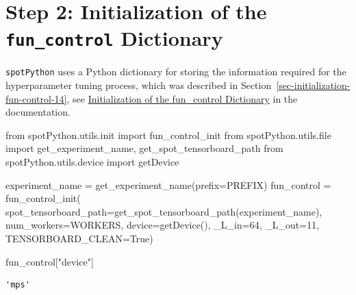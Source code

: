 \documentclass[
  letterpaper,
  DIV=11,
  numbers=noendperiod]{scrreprt}
\newenvironment{Shaded}{\begin{snugshade}}{\end{snugshade}}
\newcommand{\BuiltInTok}[1]{\textcolor[rgb]{0.00,0.23,0.31}{#1}}
\newcommand{\DecValTok}[1]{\textcolor[rgb]{0.68,0.00,0.00}{#1}}
\newcommand{\ImportTok}[1]{\textcolor[rgb]{0.00,0.46,0.62}{#1}}
\newcommand{\NormalTok}[1]{\textcolor[rgb]{0.00,0.23,0.31}{#1}}
\newcommand{\OperatorTok}[1]{\textcolor[rgb]{0.37,0.37,0.37}{#1}}
\newcommand{\StringTok}[1]{\textcolor[rgb]{0.13,0.47,0.30}{#1}}
\newcommand{\VariableTok}[1]{\textcolor[rgb]{0.07,0.07,0.07}{#1}}
\begin{document}
\hypertarget{step-2-initialization-of-the-fun_control-dictionary}{%
\section{\texorpdfstring{Step 2: Initialization of the
\texttt{fun\_control}
Dictionary}{Step 2: Initialization of the fun\_control Dictionary}}\label{step-2-initialization-of-the-fun_control-dictionary}}

\texttt{spotPython} uses a Python dictionary for storing the information
required for the hyperparameter tuning process, which was described in
Section~\ref{sec-initialization-fun-control-14}, see
\href{https://sequential-parameter-optimization.github.io/spotPython/14_spot_ray_hpt_torch_cifar10.html\#sec-initialization-fun-control-14}{Initialization
of the fun\_control Dictionary} in the documentation.

\begin{Shaded}
\begin{Highlighting}[]
\ImportTok{from}\NormalTok{ spotPython.utils.init }\ImportTok{import}\NormalTok{ fun\_control\_init}
\ImportTok{from}\NormalTok{ spotPython.utils.}\BuiltInTok{file} \ImportTok{import}\NormalTok{ get\_experiment\_name, get\_spot\_tensorboard\_path}
\ImportTok{from}\NormalTok{ spotPython.utils.device }\ImportTok{import}\NormalTok{ getDevice}

\NormalTok{experiment\_name }\OperatorTok{=}\NormalTok{ get\_experiment\_name(prefix}\OperatorTok{=}\NormalTok{PREFIX)}
\NormalTok{fun\_control }\OperatorTok{=}\NormalTok{ fun\_control\_init(}
\NormalTok{    spot\_tensorboard\_path}\OperatorTok{=}\NormalTok{get\_spot\_tensorboard\_path(experiment\_name),}
\NormalTok{    num\_workers}\OperatorTok{=}\NormalTok{WORKERS,}
\NormalTok{    device}\OperatorTok{=}\NormalTok{getDevice(),}
\NormalTok{    \_L\_in}\OperatorTok{=}\DecValTok{64}\NormalTok{,}
\NormalTok{    \_L\_out}\OperatorTok{=}\DecValTok{11}\NormalTok{,}
\NormalTok{    TENSORBOARD\_CLEAN}\OperatorTok{=}\VariableTok{True}\NormalTok{)}
\end{Highlighting}
\end{Shaded}

\begin{Shaded}
\begin{Highlighting}[]
\NormalTok{fun\_control[}\StringTok{"device"}\NormalTok{]}
\end{Highlighting}
\end{Shaded}

\begin{verbatim}
'mps'
\end{verbatim}
\end{document}
